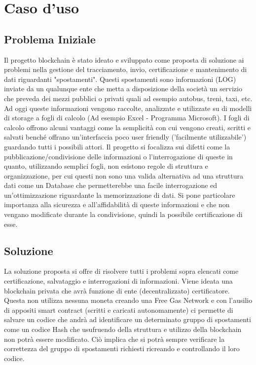 \documentclass[11pt,a4paper,titlepage]{report}
\begin{document}
\chapter{Caso d'uso}

\section{Problema Iniziale}
Il progetto blockchain è stato ideato e sviluppato come proposta di soluzione ai problemi nella gestione del tracciamento, invio, certificazione e mantenimento di dati riguardanti "spostamenti". Questi spostamenti sono informazioni (LOG) inviate da un qualunque ente che metta a disposizione della società un servizio che preveda dei mezzi pubblici o privati quali ad esempio autobus, treni, taxi, etc. Ad oggi queste informazioni vengono raccolte, analizzate e utilizzate su di modelli di storage a fogli di calcolo (Ad esempio Excel - Programma Microsoft). I fogli di calcolo offrono alcuni vantaggi come la semplicità con cui vengono creati, scritti e salvati benché offrano un'interfaccia poco user friendly ('facilmente utilizzabile') guardando tutti i possibili attori. Il progetto si focalizza sui difetti come la pubblicazione/condivisione delle informazioni o l'interrogazione di queste in quanto, utilizzando semplici fogli, non esistono regole di struttura e organizzazione, per cui questi non sono una valida alternativa ad una struttura dati come un Database che permetterebbe una facile interrogazione ed un'ottimizzazione riguardante la memorizzazione di dati. Si pone particolare importanza alla sicurezza e all'affidabilità di queste informazioni e che non vengano modificate durante la condivisione, quindi la possibile certificazione di esse.

\section{Soluzione}
La soluzione proposta si offre di risolvere tutti i problemi sopra elencati come certificazione, salvataggio e interrogazioni di informazioni. Viene ideata una blockchain privata che avrà funzione di ente (decentralizzato) certificatore. Questa non utilizza nessuna moneta creando una Free Gas Network e con l'ausilio di appositi smart contract (scritti e caricati autonomamente) ci permette di salvare un codice che andrà ad identificare un determinato gruppo di spostamenti come un codice Hash che usufruendo della struttura e utilizzo della blockchain non potrà essere modificato. Ciò implica che si potrà sempre verificare la correttezza del gruppo di spostamenti richiesti ricreando e controllando il loro codice.
\end{document}
